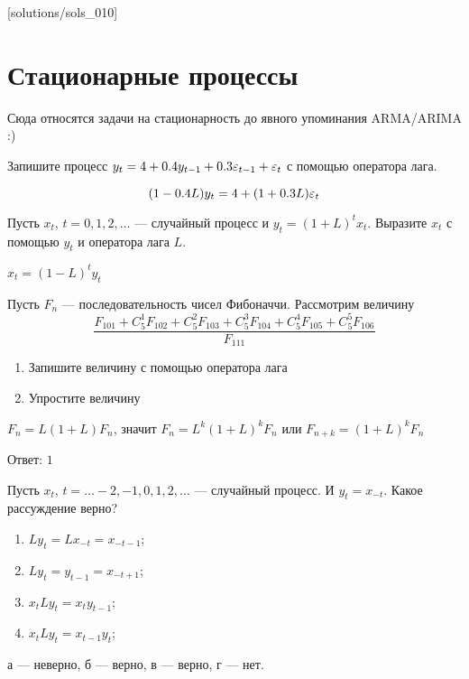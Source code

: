 [solutions/sols_010]

\chapter{Стационарные процессы}

Сюда относятся задачи на стационарность до явного упоминания ARMA/ARIMA :)

\begin{problem}
Запишите процесс $y_t = 4 + 0.4y_{t-1} + 0.3\varepsilon_{t-1} + \varepsilon_t$ с помощью оператора лага.
\begin{sol}
\[
(1 - 0.4L)y_t = 4 + (1 + 0.3L)\varepsilon_t
\]
\end{sol}
\end{problem}


\begin{problem}
Пусть $x_{t}$, $t=0,1,2, \ldots$ — случайный процесс и $y_{t}=(1+L)^{t}x_{t}$.
Выразите $x_{t}$ с помощью $y_{t}$ и оператора лага $L$.

\begin{sol}
$x_{t}=(1-L)^{t}y_{t}$
\end{sol}
\end{problem}

\begin{problem}
Пусть $ F_{n} $ — последовательность чисел Фибоначчи. Рассмотрим величину
\[
\frac{F_{101}+C^{1}_{5}F_{102}+C^{2}_{5}F_{103}+C^{3}_{5}F_{104}+C^{4}_{5}F_{105}+C^{5}_{5}F_{106}}
{F_{111}}
\]
\begin{enumerate}
\item Запишите величину с помощью оператора лага
\item Упростите величину
\end{enumerate}

\begin{sol}
$ F_{n}=L(1+L)F_{n} $, значит $ F_{n}=L^{k}(1+L)^{k}F_{n} $ или $ F_{n+k}=(1+L)^{k}F_{n} $

Ответ: $1$
\end{sol}
\end{problem}




\begin{problem}
Пусть $x_{t}$, $t=\ldots -2,-1,0,1,2,\ldots $ — случайный процесс. И $y_{t}=x_{-t}$. Какое рассуждение верно?

\begin{enumerate}
\item $Ly_{t}=Lx_{-t}=x_{-t-1}$;
\item $Ly_{t}=y_{t-1}=x_{-t+1}$;
\item $x_t L y_t = x_t y_{t-1}$;
\item $x_t L y_t = x_{t-1} y_t$;
\end{enumerate}
\begin{sol}
а — неверно, б — верно, в — верно, г — нет.
\end{sol}
\end{problem}

